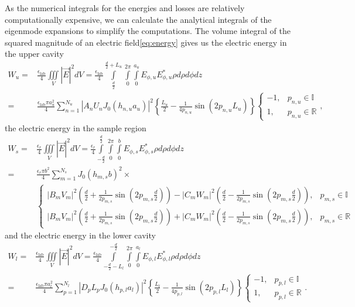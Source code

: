 As the numerical integrals for the energies and losses are relatively computationally expensive, we can calculate the analytical integrals of the eigenmode expansions to simplify the computations. The volume integral of the squared magnitude of an electric field\eqref{eq:energy} gives us the electric energy in the upper cavity
\begin{align}
W_u =& \frac{\epsilon_{\text{lab}} }{4}\iiint\limits_{\mathit{V}}|\vec{E}|^2 \mathit{dV}=\frac{\epsilon_{\text{lab}}}{4}\int\limits_{\frac{d}{2}}^{\frac{d}{2}+L_u}\int\limits_0^{2\pi}\int\limits_0^{a_u} E_{\phi,u}E_{\phi,u}^* \rho\mathit{d\rho d\phi dz}\\
	=& \frac{\epsilon_{\text{lab}}\pi a_u^2}{4}\sum\limits_{n=1}^{N_u}|A_nU_nJ_0(h_{n,u}a_u)|^2\left\lbrace\frac{L_u}{2}-\frac{1}{4p_{n,u}}\sin(2p_{n,u}L_u)\right\rbrace\begin{cases}-1, &p_{n,u}\in\mathbb{I}\\1, &p_{n,u}\in\mathbb{R}\end{cases}\text{,}\label{eq:w_u}
 \end{align}
the electric energy in the sample region
\begin{align}
W_s =& \frac{\epsilon_r}{4}\iiint\limits_{\mathit{V}}|\vec{E}|^2 \mathit{dV}=\frac{\epsilon_r}{4}\int\limits_{-\frac{d}{2}}^{\frac{d}{2}}\int\limits_0^{2\pi}\int\limits_0^b E_{\phi,s}E_{\phi,s}^* \rho\mathit{d\rho d\phi dz}\\
	=& \frac{\epsilon_r\pi b^2}{4}\sum\limits_{m=1}^{N_s}J_0(h_{m,s}b)^2\times\nonumber\\&\begin{cases}|B_mV_m|^2(\frac{d}{2}+\frac{1}{2p_{m,s}}\sin(2p_{m,s}\frac{d}{2}))-|C_mW_m|^2(\frac{d}{2}-\frac{1}{2p_{m,s}}\sin(2p_{m,s}\frac{d}{2})), & p_{m,s}\in\mathbb{I}\\|B_mV_m|^2(\frac{d}{2}+\frac{1}{2p_{m,s}}\sin(2p_{m,s}\frac{d}{2}))+|C_mW_m|^2(\frac{d}{2}-\frac{1}{2p_{m,s}}\sin(2p_{m,s}\frac{d}{2})), & p_{m,s}\in\mathbb{R}\end{cases}
 \end{align}
 and the electric energy in the lower cavity
 \begin{align}
W_l =& \frac{\epsilon_{\text{lab}} }{4}\iiint\limits_{\mathit{V}}|\vec{E}|^2 \mathit{dV}=\frac{\epsilon_{\text{lab}}}{4}\int\limits_{-\frac{d}{2}-L_l}^{-\frac{d}{2}}\int\limits_0^{2\pi}\int\limits_0^{a_l} E_{\phi,l}E_{\phi,l}^* \rho\mathit{d\rho d\phi dz}\\
	=& \frac{\epsilon_{\text{lab}}\pi a_l^2}{4}\sum\limits_{p=1}^{N_l}|D_pL_pJ_0(h_{p,l}a_l)|^2\left\lbrace\frac{L_l}{2}-\frac{1}{4p_{p,l}}\sin(2p_{p,l}L_l)\right\rbrace\begin{cases}-1, &p_{p,l}\in\mathbb{I}\\1, &p_{p,l}\in\mathbb{R}\end{cases}\text{.}\label{eq:w_l}
 \end{align}
